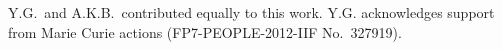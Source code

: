 \documentclass[aps,prl,twocolumn,superscriptaddress]{revtex4-1}
\newcommand{\vcrm}[1]{\mathbf{#1}}
\newcommand{\hvcrm}[1]{\mathbf{\hat{#1}}}
\newcommand{\vc}[1]{\boldsymbol{#1}}
\newcommand{\hvc}[1]{\boldsymbol{\hat{#1}}}
\newcommand{\kk}{\mathrm{k}_B}
\begin{document}
Y.G.\ and A.K.B.\ contributed equally to this work. Y.G. acknowledges support from Marie Curie actions (FP7-PEOPLE-2012-IIF No.\ 327919).






%
\end{document}

